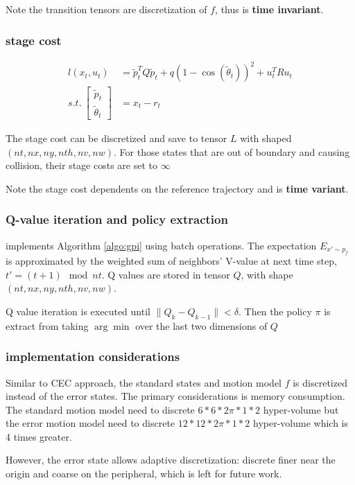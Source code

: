 \documentclass[conference]{IEEEtran}
\begin{document}
Note the transition tensors are discretization of $f$, thus is \textbf{time invariant}.

\subsubsection{stage cost}
$$
\begin{aligned}
l(x_t, u_t) &= 
    \tilde{p}^{T}_{t}Q\tilde{p}_{t} 
    + q\left( 1-\cos \left( \tilde{\theta}_{t}  \right)  \right)^{2} 
    + u^{T}_{t}Ru_{t} \\
s.t. \ \left[ \begin{gathered}\tilde{p}_{t}\\ \tilde{\theta}_{t} \end{gathered}  \right] 
    &= x_{t}-r_{t}
\end{aligned}
$$

The stage cost can be discretized and save to tensor $L$ with shaped $(nt, nx, ny, nth, nv, nw)$.
For those states that are out of boundary and causing collision, 
their stage costs are set to $\infty$

Note the stage cost dependents on the reference trajectory and is \textbf{time variant}.

\subsubsection{Q-value iteration and policy extraction}
implements Algorithm \ref{algo:gpi} using batch operations.
The expectation $E_{x' \sim p_f}$ is approximated by the weighted sum of 
neighbors' V-value at next time step, $t' = (t+1)\mod nt$.
Q values are stored in tensor $Q$, with shape $(nt, nx, ny, nth, nv, nw)$.

Q value iteration is executed until $\|Q_k - Q_{k-1}\| < \delta$.
Then the policy $\pi$ is extract from taking $\arg\min$ over the last two dimensions of $Q$

\subsubsection{implementation considerations}
Similar to CEC approach, 
the standard states and motion model $f$ is discretized instead of the error states.
The primary considerations is memory consumption.
The standard motion model need to discrete $6*6*2\pi*1*2$ hyper-volume 
but the error motion model need to discrete $12*12*2\pi*1*2$ hyper-volume which is 4 times greater.

However, the error state allows adaptive discretization: 
discrete finer near the origin and coarse on the peripheral, 
which is left for future work.
\end{document}
